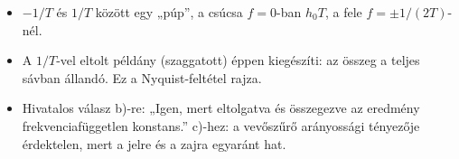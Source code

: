 \begin{rajz}
\begin{center}
\end{center}
\begin{itemize}
\item $-1/T$ és $1/T$ között egy „púp”, a csúcsa $f=0$-ban $h_0T$, a fele $f=\pm1/(2T)$-nél.
\item A $1/T$-vel eltolt példány (szaggatott) éppen kiegészíti: az összeg a teljes sávban állandó. Ez a Nyquist-feltétel rajza.
\end{itemize}
\end{rajz}
\begin{eredmeny}

\begin{center}\end{center}
\end{eredmeny}
\begin{tipp}[Ellenőrzés]
\begin{itemize}
\item Hivatalos válasz b)-re: „Igen, mert eltolgatva és összegezve az eredmény frekvenciafüggetlen konstans.” c)-hez: a vevőszűrő arányossági tényezője érdektelen, mert a jelre és a zajra egyaránt hat.
\end{itemize}
\end{tipp}


